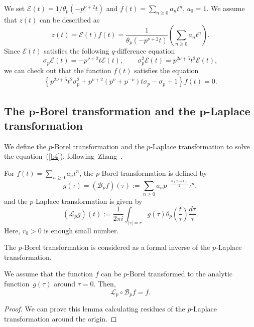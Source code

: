 \documentclass[pdftex]{sigma}
\begin{document}
We set $\mathcal{E}(t)=1/\theta_p(-p^{\nu +2}t)$ and $f(t)=\sum\limits_{n\ge 0}a_nt^n$, $a_0=1$. We assume that $z(t)$ can be described as
\[z(t)=\mathcal{E}(t)f(t)=\frac{1}{\theta_p(-p^{\nu +2}t)}\left(\sum_{n\ge 0}a_nt^n\right).\]
Since $\mathcal{E}(t)$ satisf\/ies the following $q$-dif\/ference equation
\[\sigma_p\mathcal{E}(t)=-p^{\nu +2}t\mathcal{E}(t),\qquad
\sigma_p^2\mathcal{E}(t)=p^{2\nu +5}t^2\mathcal{E}(t),\]
we can check out that the function $f(t)$ satisf\/ies the equation
\begin{gather}
\left\{p^{2\nu +5}t^2\sigma_p^2 +p^{\nu +2} (p^\nu +p^{-\nu})t\sigma_p-\sigma_p +1\right\}f(t)=0.
\label{b4}
\end{gather}

\subsection[The $p$-Borel transformation and the $p$-Laplace transformation]{The $\boldsymbol{p}$-Borel transformation and the $\boldsymbol{p}$-Laplace transformation}\label{section2.3}

We def\/ine the $p$-Borel transformation and the $p$-Laplace transformation to solve the equation~(\ref{b4}), following~Zhang~\cite{Z1}.

\begin{definition}For $f(t)=\sum\limits_{n\ge 0}a_nt^n$, the $p$-Borel transformation is def\/ined by
\[g(\tau )=\left(\mathcal{B}_pf\right)(\tau ):=\sum_{n\ge 0}a_np^{-\frac{n(n-1)}{2}}\tau^n,\]
and the $p$-Laplace transformation is given by
\[
\left(\mathcal{L}_pg\right)(t):=\frac{1}{2\pi i}\int_{|\tau |=r}g(\tau )\theta_p\left(\frac{t}{\tau}\right)\frac{d\tau}{\tau }.
\]
Here, $r_0>0$ is enough small number.
\end{definition}
 The $p$-Borel transformation is considered as a formal inverse of the $p$-Laplace transformation.
\begin{lemma}We assume that the function $f$ can be $p$-Borel transformed to the analytic func\-tion~$g(\tau )$ around $\tau =0$. Then,
\[
\mathcal{L}_p\circ\mathcal{B}_pf=f.
\]
\end{lemma}

\begin{proof}We can prove this lemma calculating residues of the $p$-Laplace transformation around the origin.
\end{proof}
\end{document}
